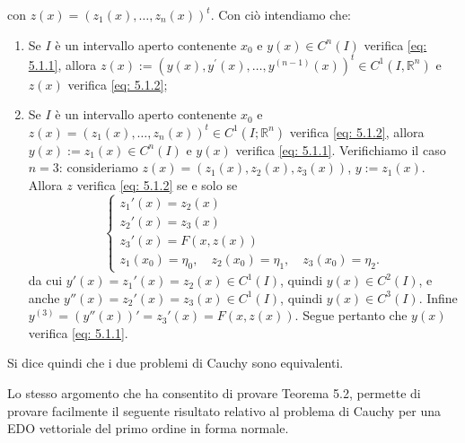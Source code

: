\begin{oss}
    con $z(x)=\left(z_{1}(x), \ldots, z_{n}(x)\right)^{t}$. Con ciò intendiamo che:
    \begin{enumerate}[i]
        \item  Se $I$ è un intervallo aperto contenente $x_{0}$ e $y(x) \in C^{n}(I)$ verifica \eqref{eq: 5.1.1}, allora $z(x):=\left(y(x), y^{\prime}(x), \ldots, y^{(n-1)}(x)\right)^{t} \in C^{1}\left(I, \mathbb{R}^{n}\right)$ e $z(x)$ verifica \ref{eq: 5.1.2};
        \item Se $I$ è un intervallo aperto contenente $x_{0}$ e $z(x)=\left(z_{1}(x), \ldots, z_{n}(x)\right)^{t} \in C^{1}\left(I; \mathbb{R}^{n}\right)$ verifica \eqref{eq: 5.1.2}, allora $y(x):=z_{1}(x) \in C^{n}(I)$ e $y(x)$ verifica \eqref{eq: 5.1.1}. Verifichiamo il caso $n=3$: consideriamo $z(x) =(z_1(x), z_2(x), z_3(x))$, $y:=z_1(x)$. Allora $z$ verifica \eqref{eq: 5.1.2} se e solo se 
        \[\begin{cases}
            z_1'(x) = z_2(x)\\
            z_2'(x) = z_3(x)\\
            z_3'(x) = F(x, z(x))\\
            z_1(x_0) = \eta_0, \quad 
            z_2(x_0) = \eta_1, \quad
            z_3(x_0) = \eta_2.
        \end{cases}\]
        da cui $y'(x) = z_1'(x) = z_2(x) \in C^1(I)$, quindi $y(x)\in C^2(I)$, e anche $y''(x) = z_2'(x) = z_3(x)\in C^1(I)$, quindi $y(x)\in C^3(I)$. Infine $y^{(3)} = (y''(x))' = z_3'(x) = F(x, z(x))$. Segue pertanto che $y(x)$ verifica \eqref{eq: 5.1.1}.
    \end{enumerate}
    Si dice quindi che i due problemi di Cauchy sono equivalenti.
\end{oss}

Lo stesso argomento che ha consentito di provare Teorema 5.2, permette di provare facilmente il seguente risultato relativo al problema di Cauchy per una EDO vettoriale del primo ordine in forma normale.

